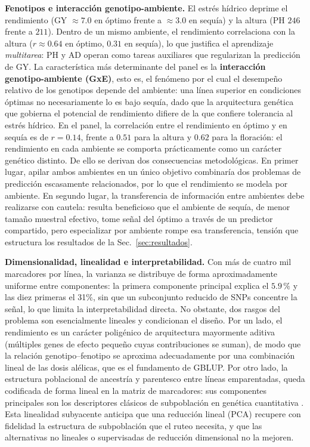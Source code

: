 \documentclass[conference]{IEEEtran}
\begin{document}
\textbf{Fenotipos e interacción genotipo-ambiente.} El estrés hídrico deprime el rendimiento (GY $\approx 7.0$ en óptimo frente a $\approx 3.0$ en sequía) y la altura (PH $246$ frente a $211$). Dentro de un mismo ambiente, el rendimiento correlaciona con la altura ($r\approx 0.64$ en óptimo, $0.31$ en sequía), lo que justifica el aprendizaje \textit{multitarea}: PH y AD operan como tareas auxiliares que regularizan la predicción de GY. La característica más determinante del panel es la \textbf{interacción genotipo-ambiente (GxE)}, esto es, el fenómeno por el cual el desempeño relativo de los genotipos depende del ambiente: una línea superior en condiciones óptimas no necesariamente lo es bajo sequía, dado que la arquitectura genética que gobierna el potencial de rendimiento difiere de la que confiere tolerancia al estrés hídrico. En el panel, la correlación entre el rendimiento en óptimo y en sequía es de $r=0.14$, frente a $0.51$ para la altura y $0.62$ para la floración: el rendimiento en cada ambiente se comporta prácticamente como un carácter genético distinto. De ello se derivan dos consecuencias metodológicas. En primer lugar, apilar ambos ambientes en un único objetivo combinaría dos problemas de predicción escasamente relacionados, por lo que el rendimiento se modela por ambiente. En segundo lugar, la transferencia de información entre ambientes debe realizarse con cautela: resulta beneficioso que el ambiente de sequía, de menor tamaño muestral efectivo, tome señal del óptimo a través de un predictor compartido, pero especializar por ambiente rompe esa transferencia, tensión que estructura los resultados de la Sec.~\ref{sec:resultados}.

\textbf{Dimensionalidad, linealidad e interpretabilidad.} Con más de cuatro mil marcadores por línea, la varianza se distribuye de forma aproximadamente uniforme entre componentes: la primera componente principal explica el $5.9\,\%$ y las diez primeras el 31\%, sin que un subconjunto reducido de SNPs concentre la señal, lo que limita la interpretabilidad directa. No obstante, dos rasgos del problema son esencialmente lineales y condicionan el diseño. Por un lado, el rendimiento es un carácter poligénico de arquitectura mayormente aditiva (múltiples genes de efecto pequeño cuyas contribuciones se suman), de modo que la relación genotipo--fenotipo se aproxima adecuadamente por una combinación lineal de las dosis alélicas, que es el fundamento de GBLUP. Por otro lado, la estructura poblacional de ancestría y parentesco entre líneas emparentadas, queda codificada de forma lineal en la matriz de marcadores: sus componentes principales son los descriptores clásicos de subpoblación en genética cuantitativa \cite{price2006}. Esta linealidad subyacente anticipa que una reducción lineal (PCA) recupere con fidelidad la estructura de subpoblación que el ruteo necesita, y que las alternativas no lineales o supervisadas de reducción dimensional no la mejoren.
\end{document}
